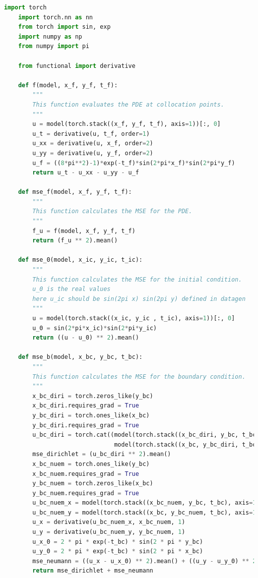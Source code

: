 \documentclass[11pt, a4paper]{article}
\begin{document}
    \lstset{style=mystyle}
    \begin{lstlisting}[language=Python, caption=Implementation of MSEs using PyTorch, label={lst:mse}]
    import torch
    import torch.nn as nn
    from torch import sin, exp
    import numpy as np
    from numpy import pi

    from functional import derivative

    def f(model, x_f, y_f, t_f):
        """
        This function evaluates the PDE at collocation points.
        """
        u = model(torch.stack((x_f, y_f, t_f), axis=1))[:, 0]
        u_t = derivative(u, t_f, order=1)
        u_xx = derivative(u, x_f, order=2)
        u_yy = derivative(u, y_f, order=2)
        u_f = ((8*pi**2)-1)*exp(-t_f)*sin(2*pi*x_f)*sin(2*pi*y_f)
        return u_t - u_xx - u_yy - u_f

    def mse_f(model, x_f, y_f, t_f):
        """
        This function calculates the MSE for the PDE.
        """
        f_u = f(model, x_f, y_f, t_f)
        return (f_u ** 2).mean()

    def mse_0(model, x_ic, y_ic, t_ic):
        """
        This function calculates the MSE for the initial condition.
        u_0 is the real values
        here u_ic should be sin(2pi x) sin(2pi y) defined in datagen
        """
        u = model(torch.stack((x_ic, y_ic , t_ic), axis=1))[:, 0]
        u_0 = sin(2*pi*x_ic)*sin(2*pi*y_ic)
        return ((u - u_0) ** 2).mean()

    def mse_b(model, x_bc, y_bc, t_bc):
        """
        This function calculates the MSE for the boundary condition.
        """
        x_bc_diri = torch.zeros_like(y_bc)
        x_bc_diri.requires_grad = True
        y_bc_diri = torch.ones_like(x_bc)
        y_bc_diri.requires_grad = True
        u_bc_diri = torch.cat((model(torch.stack((x_bc_diri, y_bc, t_bc), axis=1))[:, 0],
                               model(torch.stack((x_bc, y_bc_diri, t_bc), axis=1))[:, 0]))
        mse_dirichlet = (u_bc_diri ** 2).mean()
        x_bc_nuem = torch.ones_like(y_bc)
        x_bc_nuem.requires_grad = True
        y_bc_nuem = torch.zeros_like(x_bc)
        y_bc_nuem.requires_grad = True
        u_bc_nuem_x = model(torch.stack((x_bc_nuem, y_bc, t_bc), axis=1))[:, 0]
        u_bc_nuem_y = model(torch.stack((x_bc, y_bc_nuem, t_bc), axis=1))[:, 0]
        u_x = derivative(u_bc_nuem_x, x_bc_nuem, 1)
        u_y = derivative(u_bc_nuem_y, y_bc_nuem, 1)
        u_x_0 = 2 * pi * exp(-t_bc) * sin(2 * pi * y_bc)
        u_y_0 = 2 * pi * exp(-t_bc) * sin(2 * pi * x_bc)
        mse_neumann = ((u_x - u_x_0) ** 2).mean() + ((u_y - u_y_0) ** 2).mean()
        return mse_dirichlet + mse_neumann
    \end{lstlisting}
\end{document}
